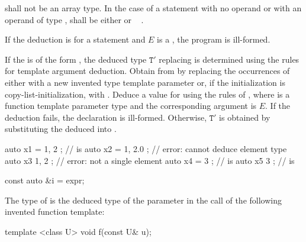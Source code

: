  shall not be an array type.
In the case of a  statement with no operand
or with an operand of type ,
 shall be either
  or
\cv{}~ .

\pnum
If the deduction is for a  statement
and $E$ is a ,
the program is ill-formed.

\pnum
If the  is of the form
 ,
the deduced type
$\mathtt{T}'$ replacing 
is determined using the rules for template argument deduction.
Obtain  from
 by replacing the occurrences of
  either with
a new invented type template parameter  or,
if the initialization is copy-list-initialization, with
. Deduce a value for  using the rules
of ,
where  is a
function template parameter type and
the corresponding argument is $E$.
If the deduction fails, the declaration is ill-formed.
Otherwise, $\mathtt{T}'$ is obtained by
substituting the deduced  into .
\begin{example}
\begin{codeblock}
auto x1 = { 1, 2 };             //  is 
auto x2 = { 1, 2.0 };           // error: cannot deduce element type
auto x3{ 1, 2 };                // error: not a single element
auto x4 = { 3 };                //  is 
auto x5{ 3 };                   //  is 
\end{codeblock}
\end{example}

\begin{example}
\begin{codeblock}
const auto &i = expr;
\end{codeblock}
The type of  is the deduced type of the parameter  in
the call  of the following invented function template:
\begin{codeblock}
template <class U> void f(const U& u);
\end{codeblock}
\end{example}

